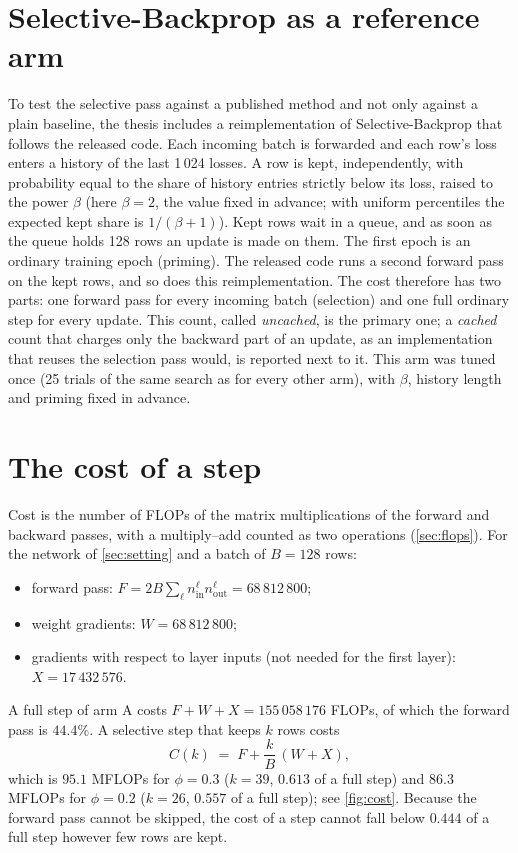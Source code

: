 \section{Selective-Backprop as a reference arm}\label{sec:sb}
To test the selective pass against a published method and not only against a plain baseline, the thesis includes a reimplementation of Selective-Backprop \citep{jiang2019selective} that follows the released code. Each incoming batch is forwarded and each row's loss enters a history of the last 1\,024 losses. A row is kept, independently, with probability equal to the share of history entries strictly below its loss, raised to the power $\beta$ (here $\beta=2$, the value fixed in advance; with uniform percentiles the expected kept share is $1/(\beta+1)$). Kept rows wait in a queue, and as soon as the queue holds 128 rows an update is made on them. The first epoch is an ordinary training epoch (priming). The released code runs a second forward pass on the kept rows, and so does this reimplementation. The cost therefore has two parts: one forward pass for every incoming batch (selection) and one full ordinary step for every update. This count, called \emph{uncached}, is the primary one; a \emph{cached} count that charges only the backward part of an update, as an implementation that reuses the selection pass would, is reported next to it. This arm was tuned once (25 trials of the same search as for every other arm), with $\beta$, history length and priming fixed in advance.

\section{The cost of a step}\label{sec:cost-model}
Cost is the number of FLOPs of the matrix multiplications of the forward and backward passes, with a multiply--add counted as two operations (\cref{sec:flops}). For the network of \cref{sec:setting} and a batch of $B=128$ rows:
\begin{itemize}
\item forward pass: $F=2B\sum_\ell n^\ell_{\mathrm{in}}n^\ell_{\mathrm{out}} = 68\,812\,800$;
\item weight gradients: $W=68\,812\,800$;
\item gradients with respect to layer inputs (not needed for the first layer): $X=17\,432\,576$.
\end{itemize}
A full step of arm A costs $F+W+X=155\,058\,176$ FLOPs, of which the forward pass is $44.4\%$. A selective step that keeps $k$ rows costs
\begin{equation}
C(k) \;=\; F + \frac{k}{B}\,(W+X),
\end{equation}
which is $95.1$ MFLOPs for $\phi=0.3$ ($k=39$, $0.613$ of a full step) and $86.3$ MFLOPs for $\phi=0.2$ ($k=26$, $0.557$ of a full step); see \cref{fig:cost}. Because the forward pass cannot be skipped, the cost of a step cannot fall below $0.444$ of a full step however few rows are kept.

